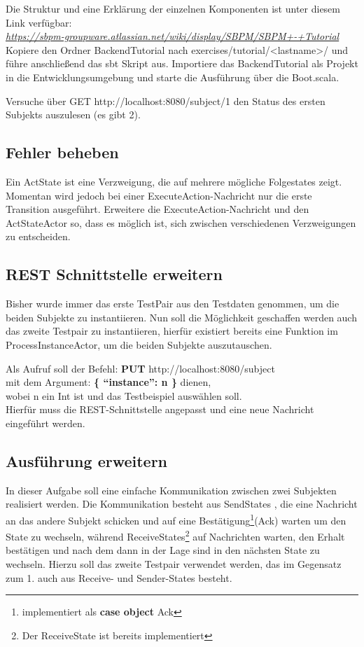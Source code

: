 \documentclass[11pt]{tudexercise}
\newcommand{\link}[1]{\\ \textcolor{blue}{\textit{\url{#1}}}}
\begin{document}
    Die Struktur und eine Erklärung der einzelnen Komponenten ist unter diesem Link verfügbar:
    \link{https://sbpm-groupware.atlassian.net/wiki/display/SBPM/SBPM+-+Tutorial}\\
    Kopiere den Ordner BackendTutorial nach exercises/tutorial/<lastname>/ und führe anschließend das sbt Skript aus.
    Importiere das BackendTutorial als Projekt in die Entwicklungsumgebung und starte die Ausführung
    über die Boot.scala.

    Versuche über GET http://localhost:8080/subject/1 den Status des ersten Subjekts auszulesen (es gibt 2).

  \subsection{Fehler beheben}
    Ein ActState ist eine Verzweigung, die auf mehrere mögliche Folgestates zeigt. Momentan wird jedoch bei
    einer ExecuteAction-Nachricht nur die erste Transition ausgeführt. Erweitere die ExecuteAction-Nachricht
    und den ActStateActor so, dass es möglich ist, sich zwischen verschiedenen Verzweigungen zu entscheiden.

  \subsection{REST Schnittstelle erweitern}
    Bisher wurde immer das erste TestPair aus den Testdaten genommen, um die beiden Subjekte zu instantiieren.
    Nun soll die Möglichkeit geschaffen werden auch das zweite Testpair zu instantiieren,
    hierfür existiert bereits eine Funktion im ProcessInstanceActor,
    um die beiden Subjekte auszutauschen.

    Als Aufruf soll der Befehl:
    \textbf{PUT} http://localhost:8080/subject\\
    mit dem Argument: \textbf{\{ “instance”: n \}} dienen,\\
    wobei n ein Int ist und das Testbeispiel auswählen soll.\\
    Hierfür muss die REST-Schnittstelle angepasst und eine neue Nachricht eingeführt werden.

  \subsection{Ausführung erweitern}
    In dieser Aufgabe soll eine einfache Kommunikation zwischen zwei Subjekten realisiert werden.
    Die Kommunikation besteht aus SendStates , die eine Nachricht an das andere Subjekt schicken
    und auf eine Bestätigung\footnote{implementiert als \textbf{case object} Ack}(Ack) warten um den State zu wechseln,
    während ReceiveStates\footnote{Der ReceiveState ist bereits implementiert}
    auf Nachrichten warten, den Erhalt bestätigen und nach dem dann in der Lage sind
    in den nächsten State zu wechseln. Hierzu soll das zweite Testpair verwendet werden,
    das im Gegensatz zum 1. auch aus Receive- und Sender-States besteht.
\end{document}
